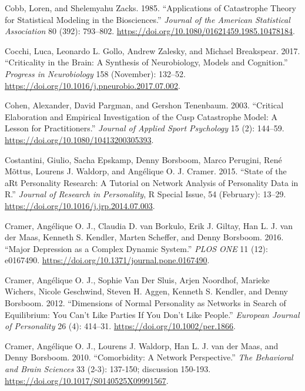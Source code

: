 \documentclass[
  a4paper,
  DIV=11,
  numbers=noendperiod,
  oneside]{scrreprt}
\newlength{\cslhangindent}
\newenvironment{CSLReferences}[2] %
 {\begin{list}{}{%
  \setlength{\itemindent}{0pt}
  \setlength{\leftmargin}{0pt}
  \setlength{\parsep}{0pt}
  \ifodd #1
   \setlength{\leftmargin}{\cslhangindent}
   \setlength{\itemindent}{-1\cslhangindent}
  \fi
  \setlength{\itemsep}{#2\baselineskip}}}
 {\end{list}}
\begin{document}
\begin{CSLReferences}{1}{0}
Cobb, Loren, and Shelemyahu Zacks. 1985. {``Applications of {Catastrophe
Theory} for {Statistical Modeling} in the {Biosciences}.''}
\emph{Journal of the American Statistical Association} 80 (392):
793--802. \url{https://doi.org/10.1080/01621459.1985.10478184}.

Cocchi, Luca, Leonardo L. Gollo, Andrew Zalesky, and Michael Breakspear.
2017. {``Criticality in the Brain: {A} Synthesis of Neurobiology, Models
and Cognition.''} \emph{Progress in Neurobiology} 158 (November):
132--52. \url{https://doi.org/10.1016/j.pneurobio.2017.07.002}.

Cohen, Alexander, David Pargman, and Gershon Tenenbaum. 2003.
{``Critical {Elaboration} and {Empirical Investigation} of the {Cusp
Catastrophe Model}: {A Lesson} for {Practitioners}.''} \emph{Journal of
Applied Sport Psychology} 15 (2): 144--59.
\url{https://doi.org/10.1080/10413200305393}.

Costantini, Giulio, Sacha Epskamp, Denny Borsboom, Marco Perugini, René
Mõttus, Lourens J. Waldorp, and Angélique O. J. Cramer. 2015. {``State
of the {aRt} Personality Research: {A} Tutorial on Network Analysis of
Personality Data in {R}.''} \emph{Journal of Research in Personality}, R
{Special Issue}, 54 (February): 13--29.
\url{https://doi.org/10.1016/j.jrp.2014.07.003}.

Cramer, Angélique O. J., Claudia D. van Borkulo, Erik J. Giltay, Han L.
J. van der Maas, Kenneth S. Kendler, Marten Scheffer, and Denny
Borsboom. 2016. {``Major Depression as a Complex Dynamic System.''}
\emph{PLOS ONE} 11 (12): e0167490.
\url{https://doi.org/10.1371/journal.pone.0167490}.

Cramer, Angélique O. J., Sophie Van Der Sluis, Arjen Noordhof, Marieke
Wichers, Nicole Geschwind, Steven H. Aggen, Kenneth S. Kendler, and
Denny Borsboom. 2012. {``Dimensions of Normal Personality as Networks in
Search of Equilibrium: You Can't Like Parties If You Don't Like
People.''} \emph{European Journal of Personality} 26 (4): 414--31.
\url{https://doi.org/10.1002/per.1866}.

Cramer, Angélique O. J., Lourens J. Waldorp, Han L. J. van der Maas, and
Denny Borsboom. 2010. {``Comorbidity: A Network Perspective.''}
\emph{The Behavioral and Brain Sciences} 33 (2-3): 137-150; discussion
150-193. \url{https://doi.org/10.1017/S0140525X09991567}.


\end{CSLReferences}
\end{document}
